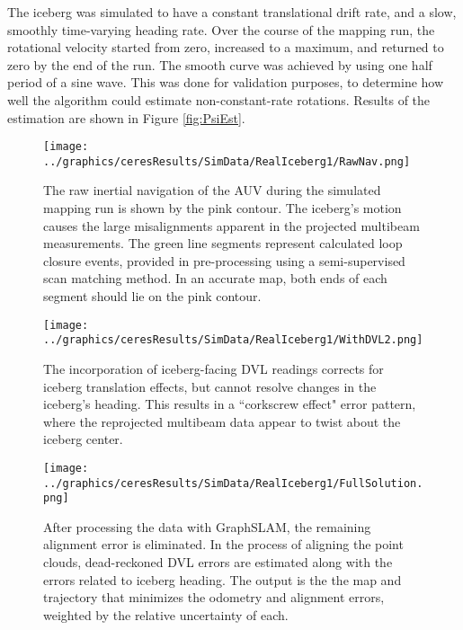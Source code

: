 The iceberg was simulated to have a constant translational drift rate, and a slow, smoothly time-varying heading rate. Over the course of the mapping run, the rotational velocity started from zero, increased to a maximum, and returned to zero by the end of the run. The smooth curve was achieved by using one half period of a sine wave. This was done for validation purposes, to determine how well the algorithm could estimate non-constant-rate rotations. Results of the estimation are shown in Figure \ref{fig:PsiEst}.

 \begin{figure}[!htb]
   \centering
   \texttt{[image: ../graphics/ceresResults/SimData/RealIceberg1/RawNav.png]} %
   \caption{The raw inertial navigation of the AUV during the simulated mapping run is shown by the pink contour. The iceberg's motion causes the large misalignments apparent in the projected multibeam measurements. The green line segments represent calculated loop closure events, provided in pre-processing using a semi-supervised scan matching method. In an accurate map, both ends of each segment should lie on the pink contour.}
   \label{fig:RawNav}
\end{figure}

 \begin{figure}[!htb]
   \centering
   \texttt{[image: ../graphics/ceresResults/SimData/RealIceberg1/WithDVL2.png]} %
   \caption{The incorporation of iceberg-facing DVL readings corrects for iceberg translation effects, but cannot resolve changes in the iceberg's heading. This results in a ``corkscrew effect" error pattern, where the reprojected multibeam data appear to twist about the iceberg center.}
   \label{fig:WithDVL1}
\end{figure}

 \begin{figure}[!htb]
   \centering
   \texttt{[image: ../graphics/ceresResults/SimData/RealIceberg1/FullSolution.png]} %
   \caption{After processing the data with GraphSLAM, the remaining alignment error is eliminated. In the process of aligning the point clouds, dead-reckoned DVL errors are estimated along with the errors related to iceberg heading. The output is the the map and trajectory that minimizes the odometry and alignment errors, weighted by the relative uncertainty of each. }
   \label{fig:FullSimSol}
\end{figure}

